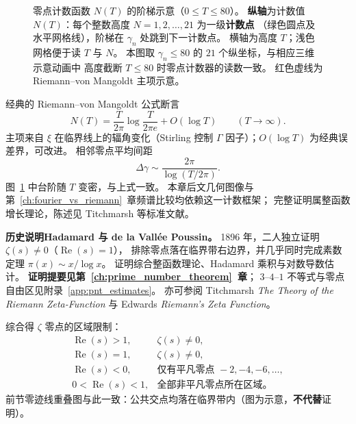 \begin{figure}[htbp]
\caption{零点计数函数 $N(T)$ 的阶梯示意（$0\le T\le 80$）。
\textbf{纵轴}为计数值 $N(T)$：每个整数高度 $N=1,2,\ldots,21$ 为一级\textbf{计数点}
（绿色圆点及水平网格线），阶梯在 $\gamma_n$ 处跳到下一计数点。
横轴为高度 $T$；浅色网格便于读 $T$ 与 $N$。
本图取 $\gamma_n\le 80$ 的 $21$ 个纵坐标，与相应三维示意动画中
高度截断 $T\le 80$ 时零点计数器的读数一致。
红色虚线为 Riemann--von Mangoldt 主项示意。}
\label{fig:NT-staircase}
\end{figure}

经典的 Riemann--von Mangoldt 公式断言
\[
\boxed{
N(T)
=
\frac{T}{2\pi}\log\frac{T}{2\pi e}
+
O(\log T)
\qquad(T\to\infty).
}
\]
主项来自 $\xi$ 在临界线上的辐角变化（Stirling 控制 $\Gamma$ 因子）；$O(\log T)$ 为经典误差界，可改进。
相邻零点平均间距
\[
\Delta\gamma\sim\frac{2\pi}{\log(T/2\pi)}.
\]
图~\ref{fig:NT-staircase} 中台阶随 $T$ 变密，与上式一致。
本章后文几何图像与第~\ref{ch:fourier_vs_riemann}~章频谱比较均依赖这一计数框架；
完整证明属整函数增长理论，陈述见 Titchmarsh 等标准文献。

\begin{historicalnote}
\textbf{历史说明\quad Hadamard 与 de la Vallée Poussin。}
1896 年，二人独立证明 $\zeta(s)\neq0$（$\operatorname{Re}(s)=1$），
排除零点落在临界带右边界，并几乎同时完成素数定理 $\pi(x)\sim x/\log x$。
证明综合整函数理论、Hadamard 乘积与对数导数估计。
\textbf{证明提要见第~\ref{ch:prime_number_theorem}~章}；
$3$--$4$--$1$ 不等式与零点自由区见附录~\ref{app:pnt_estimates}。
亦可参阅 Titchmarsh \textit{The Theory of the Riemann Zeta-Function}
与 Edwards \textit{Riemann's Zeta Function}。
\end{historicalnote}

综合得 $\zeta$ 零点的区域限制：
\[
\boxed{
\begin{array}{ll}
\operatorname{Re}(s)>1, & \zeta(s)\neq0, \\[2mm]
\operatorname{Re}(s)=1, & \zeta(s)\neq0, \\[2mm]
\operatorname{Re}(s)<0, & \text{仅有平凡零点 }-2,-4,-6,\ldots, \\[2mm]
0<\operatorname{Re}(s)<1, & \text{全部非平凡零点所在区域。}
\end{array}
}
\]
前节零迹线重叠图与此一致：公共交点均落在临界带内（图为示意，\textbf{不代替}证明）。

